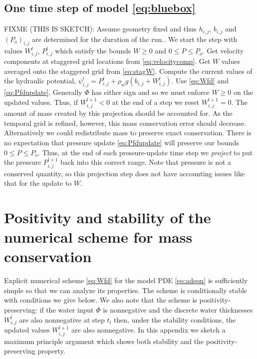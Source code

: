 \documentclass[11pt,final]{amsart}%
\newcommand{\Wlij}{W^l_{i,j}}
\newcommand{\Plij}{P^l_{i,j}}
\begin{document}
\subsection*{One time step of model \eqref{eq:bluebox}}  FIXME (THIS IS SKETCH):  Assume geometry fixed and thus $h_{i,j}$, $b_{i,j}$ and $(P_o)_{i,j}$ are determined for the duration of the run..  We start the step with values $\Wlij$, $\Plij$ which satisfy the bounds $W\ge 0$ and $0 \le P \le P_o$.  Get velocity components at staggered grid locations from \eqref{eq:velocitycomp}.  Get $W$ values averaged onto the staggered grid from \eqref{eq:stagW}.  Compute the current values of the hydraulic potential, $\psi_{i,j}^l = \Plij + \rho_w g(b_{i,j} + \Wlij)$.  Use \eqref{eq:Wfd} and \eqref{eq:Pfdupdate}.  Generally $\Phi$ has either sign and so we must enforce $W\ge 0$ on the updated values.  Thus, if $W_{i,j}^{l+1}<0$ at the end of a step we reset $W_{i,j}^{l+1}=0$.  The amount of mass created by this projection should be accounted for.  As the temporal grid is refined, however, this mass conservation error should decrease.  Alternatively we could redistribute mass to preserve exact conservation.  There is no expectation that pressure update \eqref{eq:Pfdupdate} will preserve our bounds $0\le P \le P_o$.  Thus, at the end of each pressure-update time step we \emph{project} to put the pressure $P_{i,j}^{l+1}$ back into this correct range.  Note that pressure is not a conserved quantity, so this projection step does not have accounting issues like that for the update to $W$.

\small

\normalsize

\appendix

\section{Positivity and stability of the numerical scheme for mass conservation}

Explicit numerical scheme \eqref{eq:Wfd} for the model PDE \eqref{eq:adeqn} is sufficiently simple so that we can analyze its properties.  The scheme is conditionally stable with conditions we give below.  We also note that the scheme is positivity-preserving: if the water input $\Phi$ is nonnegative and the discrete water thicknesses $\Wlij$ are also nonnegative at step $t_l$ then, under the stability conditions, the updated values $W_{i,j}^{l+1}$ are also nonnegative.  In this appendix we sketch a maximum principle argument \citep{MortonMayers} which shows both stability and the positivity-preserving property.
\end{document}
